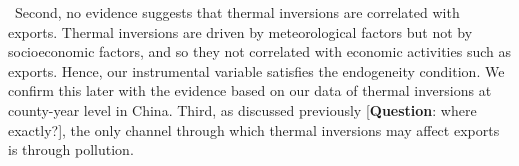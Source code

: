 \documentclass[12pt]{article}
\begin{document}
\  Second, no evidence suggests that thermal inversions are correlated with
exports. Thermal inversions are driven by meteorological factors but not by
socioeconomic factors, and so they not correlated with economic activities
such as exports. Hence, our instrumental variable satisfies the endogeneity
condition. We confirm this later with the evidence based on our data of
thermal inversions at county-year level in China. Third, as discussed
previously [\textbf{Question}: where exactly?], the only channel through
which thermal inversions may affect exports is through pollution. 

\end{document}
